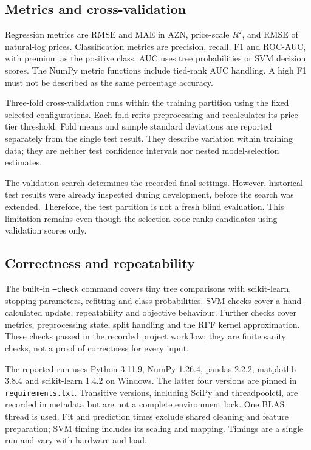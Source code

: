 \documentclass[10pt,twocolumn,a4paper]{article}
\begin{document}
\subsection{Metrics and cross-validation}
Regression metrics are RMSE and MAE in AZN, price-scale $R^2$, and RMSE of natural-log prices. Classification metrics are precision, recall, F1 and ROC-AUC, with premium as the positive class. AUC uses tree probabilities or SVM decision scores. The NumPy metric functions include tied-rank AUC handling. A high F1 must not be described as the same percentage accuracy.

Three-fold cross-validation runs within the training partition using the fixed selected configurations. Each fold refits preprocessing and recalculates its price-tier threshold. Fold means and sample standard deviations are reported separately from the single test result. They describe variation within training data; they are neither test confidence intervals nor nested model-selection estimates.

The validation search determines the recorded final settings. However, historical test results were already inspected during development, before the search was extended. Therefore, the test partition is not a fresh blind evaluation. This limitation remains even though the selection code ranks candidates using validation scores only.

\subsection{Correctness and repeatability}
The built-in \texttt{--check} command covers tiny tree comparisons with scikit-learn, stopping parameters, refitting and class probabilities. SVM checks cover a hand-calculated update, repeatability and objective behaviour. Further checks cover metrics, preprocessing state, split handling and the RFF kernel approximation. These checks passed in the recorded project workflow; they are finite sanity checks, not a proof of correctness for every input.

The reported run uses Python 3.11.9, NumPy 1.26.4, pandas 2.2.2, matplotlib 3.8.4 and scikit-learn 1.4.2 on Windows. The latter four versions are pinned in \texttt{requirements.txt}. Transitive versions, including SciPy and threadpoolctl, are recorded in metadata but are not a complete environment lock. One BLAS thread is used. Fit and prediction times exclude shared cleaning and feature preparation; SVM timing includes its scaling and mapping. Timings are a single run and vary with hardware and load.
\end{document}
